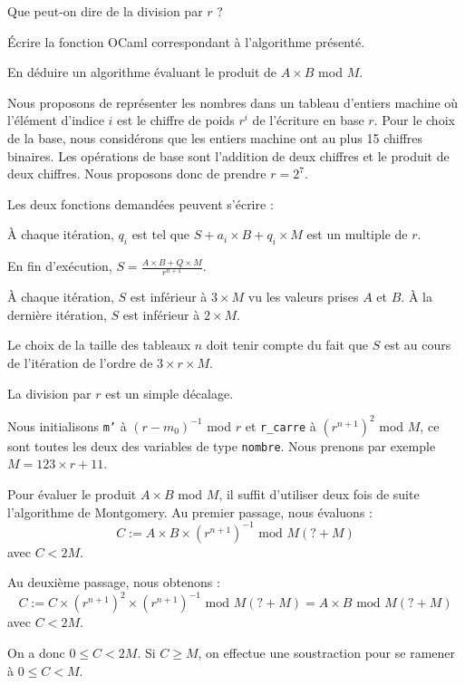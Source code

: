 Que peut-on dire de la division par $r$ ?
\medskip

Écrire la fonction OCaml correspondant à l'algorithme présenté.

\Q
En déduire un algorithme évaluant le produit de $A \times B$ mod $M$.

\Corrige

\Q
Nous proposons de représenter les nombres dans un tableau d'entiers machine où l'élément d'indice $i$ est le chiffre de poids $r^i$ de l'écriture en base $r$. Pour le choix de la base, nous considérons que les entiers machine ont au plus 15 chiffres binaires. Les opérations de base sont l'addition de deux chiffres et le produit de deux chiffres. Nous proposons donc de prendre $r=2^7$.
\medskip

Les deux fonctions demandées peuvent s'écrire :


\newpage

\Q
À chaque itération, $q_i$ est tel que $S + a_i \times B + q_i \times M$ est un multiple de $r$.
\medskip

En fin d'exécution, $S=\frac{A \times B + Q \times M}{r^{n+1}}$.
\medskip

À chaque itération, $S$ est inférieur à $3\times M$ vu les valeurs prises $A$ et $B$. À la dernière itération, $S$ est inférieur à $2 \times M$.
\medskip

Le choix de la taille des tableaux $n$ doit tenir compte du fait que $S$ est au cours de l'itération de l'ordre de $3 \times r \times M$.
\medskip

La division par $r$ est un simple décalage.
\medskip

Nous initialisons \texttt{m'} à $(r-m_0)^{-1}$ mod $r$ et \texttt{r\_carre} à $(r^{n+1})^2$ mod $M$, ce sont toutes les deux des variables de type \texttt{nombre}. Nous prenons par exemple $M=123 \times r + 11$.



\Q
Pour évaluer le produit $A \times B$ mod $M$, il suffit d'utiliser deux fois de suite l'algorithme de Montgomery. Au premier passage, nous évaluons :
\[
    C := A \times B \times (r^{n+1})^{-1} \textrm{ mod } M(? + M)
\]
avec $C < 2M$.
\medskip

Au deuxième passage, nous obtenons :
\[
    C := C \times (r^{n+1})^2 \times (r^{n+1})^{-1} \textrm{ mod } M(? + M) = A \times B \textrm{ mod } M(? + M)
\]
avec $C < 2M$.
\medskip

On a donc $0 \leq C < 2M$. Si $C \geq M$, on effectue une soustraction pour se ramener à $0 \leq C < M$.



\Fin
